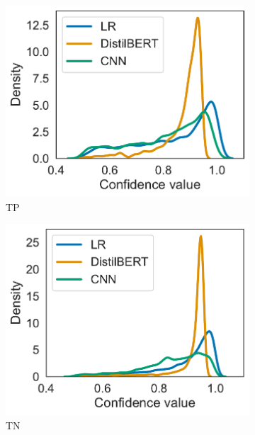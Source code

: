 \begin{figure}[H]
    \centering
    \begin{subfigure}{.35\textwidth}
        \centering
        \includegraphics[scale=.40]{Figures/confidence-densities-seen-tp.pdf}
        \caption{TP}
    \end{subfigure}
    \begin{subfigure}{.35\textwidth}
        \centering
        \includegraphics[scale=.40]{Figures/confidence-densities-seen-tn.pdf}
        \caption{TN}
    \end{subfigure}
    \begin{subfigure}{.35\textwidth}

\end{subfigure}
\end{figure}
